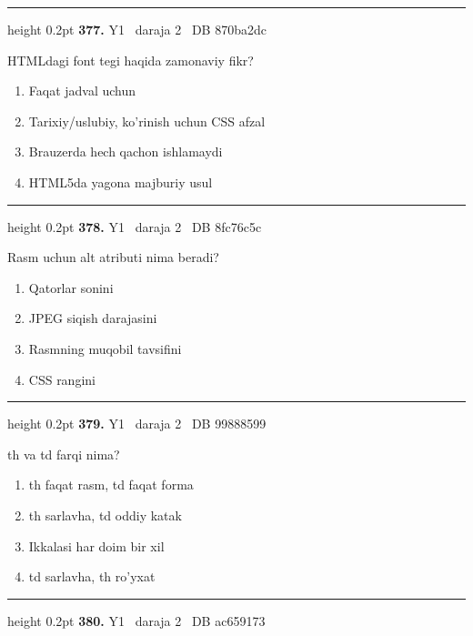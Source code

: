 \documentclass[10pt,a4paper,oneside]{article}
\begin{document}
\vspace{2mm}\hrule height 0.2pt \vspace{4mm}
\hypertarget{q377}{\textbf{\color{ink}377.}}  {\color{muted}\scriptsize Y1 \textbullet\ daraja 2 \textbullet\ DB 870ba2dc}
\par
HTMLdagi font tegi haqida zamonaviy fikr?
\begin{enumerate}[label=\Alph*),leftmargin=9mm]
\item Faqat jadval uchun
\item Tarixiy/uslubiy, ko'rinish uchun CSS afzal
\item Brauzerda hech qachon ishlamaydi
\item HTML5da yagona majburiy usul
\end{enumerate}
\vspace{2mm}\hrule height 0.2pt \vspace{4mm}
\hypertarget{q378}{\textbf{\color{ink}378.}}  {\color{muted}\scriptsize Y1 \textbullet\ daraja 2 \textbullet\ DB 8fc76c5c}
\par
Rasm uchun alt atributi nima beradi?
\begin{enumerate}[label=\Alph*),leftmargin=9mm]
\item Qatorlar sonini
\item JPEG siqish darajasini
\item Rasmning muqobil tavsifini
\item CSS rangini
\end{enumerate}
\vspace{2mm}\hrule height 0.2pt \vspace{4mm}
\hypertarget{q379}{\textbf{\color{ink}379.}}  {\color{muted}\scriptsize Y1 \textbullet\ daraja 2 \textbullet\ DB 99888599}
\par
th va td farqi nima?
\begin{enumerate}[label=\Alph*),leftmargin=9mm]
\item th faqat rasm, td faqat forma
\item th sarlavha, td oddiy katak
\item Ikkalasi har doim bir xil
\item td sarlavha, th ro'yxat
\end{enumerate}
\vspace{2mm}\hrule height 0.2pt \vspace{4mm}
\hypertarget{q380}{\textbf{\color{ink}380.}}  {\color{muted}\scriptsize Y1 \textbullet\ daraja 2 \textbullet\ DB ac659173}
\end{document}
